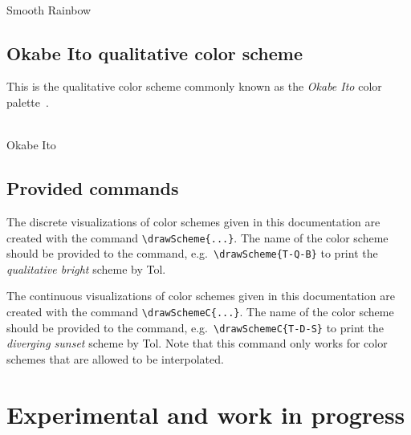 \documentclass{scrartcl}
\newcommand\marg[1]{\leavevmode\marginpar{\raggedleft #1}}
\begin{document}
\begin{center}
    \\
    Smooth Rainbow\\
\end{center}

\subsection{Okabe Ito qualitative color scheme}\label{sec:OkabeIto}
This is the qualitative color scheme commonly known as the \emph{Okabe Ito} color palette~\cite{Ichihara_2008}.

\begin{center}
    \\
    Okabe Ito
\end{center}

\subsection{Provided commands}
\cprotect\marg{\verb!\drawScheme{...}!}%
The discrete visualizations of color schemes given in this documentation are created with the command \verb!\drawScheme{...}!.
The name of the color scheme should be provided to the command, e.g.\ \verb!\drawScheme{T-Q-B}! to print the \emph{qualitative bright} scheme by Tol.

\cprotect\marg{\verb!\drawSchemeC{...}!}%
The continuous visualizations of color schemes given in this documentation are created with the command \verb!\drawSchemeC{...}!.
The name of the color scheme should be provided to the command, e.g.\ \verb!\drawSchemeC{T-D-S}! to print the \emph{diverging sunset} scheme by Tol.
Note that this command only works for color schemes that are allowed to be interpolated.

\clearpage
\section{Experimental and work in progress}

\let\oldcolor\color

\newcommand\normalvision{%
    \def\color##1{\oldcolor{##1}}%
}

\newcommand\protanopia{%
    \def\color##1{%
        \extractcolorspecs{##1}{\modelspec}{\colorspec}%
        \convertcolorspec{\modelspec}{\colorspec}{rgb}{\rgbcolorspec}%
        \tikzmath{ %
            \r = array({\rgbcolorspec},0);
            \g = array({\rgbcolorspec},1);
            \b = array({\rgbcolorspec},2);
            \rp = pow(0.06425 + 0.677*pow(\g, 2.2) + 0.2802*pow(\r, 2.2), 1./2.2);
            \gp = pow(0.06425 + 0.677*pow(\g, 2.2) + 0.2802*pow(\r, 2.2), 1./2.2);
            \bp = pow(0.06425 + 0.95724*pow(\b, 2.2) + 0.02138*pow(\g, 2.2) - 0.02138*pow(\r, 2.2), 1./2.2);
        }%
        \oldcolor[rgb]{\rp,\gp,\bp}%
    }%
}
\end{document}
